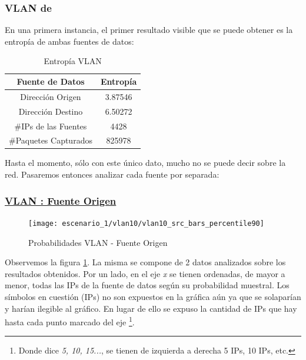 \subsubsection{VLAN de~}
\par En una primera instancia, el primer resultado visible que se puede obtener es la
entrop\'ia de ambas fuentes de datos:

\begin{table}[!h]
\centering
  \begin{tabular}{c c}
    Fuente de Datos & Entrop\'ia \\
    \hline\hline
    Direcci\'on Origen & 3.87546 \\
    Direcci\'on Destino & 6.50272 \\
    \hline\hline
    \#IPs de las Fuentes & 4428\\
    \#Paquetes Capturados & 825978\\
    \hline
    \end{tabular}
  \bigskip
  \caption{Entrop\'ia VLAN }
\end{table}

\par Hasta el momento, s\'olo con este \'unico dato, mucho no se puede decir sobre la red.
Pasaremos entonces analizar cada fuente por separada:


\subsubsection*{\underline{VLAN : Fuente Origen}}\label{subsubsec:vlan10_src}

\begin{figure}[!ht]
    \centering
    \texttt{[image: escenario\_1/vlan10/vlan10\_src\_bars\_percentile90]}
    \caption{Probabilidades VLAN  - Fuente Origen}
    \label{fig:vlan10_src_prob_per90}
\end{figure}

\par Observemos la figura \ref{fig:vlan10_src_prob_per90}. La misma se compone de 2
datos analizados sobre los resultados obtenidos. Por 
un lado, en el eje \textit{x} se tienen ordenadas, de mayor a menor, todas las IPs de la
fuente de datos seg\'un su probabilidad muestral. Los s\'imbolos en cuesti\'on (IPs) no
son expuestos en la gr\'afica a\'un ya que se solapar\'ian y har\'ian ilegible al gr\'afico.
En lugar de ello se expuso la cantidad de IPs que hay hasta cada punto marcado del eje%
\footnote{Donde dice \textit{5, 10, 15...}, se tienen de izquierda a derecha 5 IPs, 10
IPs, etc.}. 

